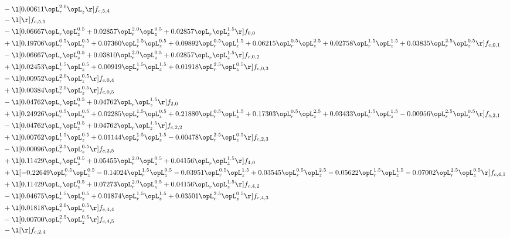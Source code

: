 \begin{alignat}{2}
& - \l[  0.00611 \opL_r^{2.0} \opL_z  \r] f_{c,5,4} \nonumber \\ 
& - \l[  \r] f_{c,5,5} \nonumber \\ 
& - \l[  0.06667 \opL_r \opL_z^{0.5} +  0.02857 \opL_r^{2.0} \opL_z^{0.5} +  0.02857 \opL_r \opL_z^{1.5}  \r] f_{0,0} \nonumber \\ 
& + \l[  0.19706 \opL_r^{0.5} \opL_z^{0.5} +  0.07360 \opL_r^{1.5} \opL_z^{0.5} +  0.09892 \opL_r^{0.5} \opL_z^{1.5} +  0.06215 \opL_r^{0.5} \opL_z^{2.5} +  0.02758 \opL_r^{1.5} \opL_z^{1.5} +  0.03835 \opL_r^{2.5} \opL_z^{0.5}  \r] f_{c,0,1} \nonumber \\ 
& - \l[  0.06667 \opL_r \opL_z^{0.5} +  0.03810 \opL_r^{2.0} \opL_z^{0.5} +  0.02857 \opL_r \opL_z^{1.5}  \r] f_{c,0,2} \nonumber \\ 
& + \l[  0.02453 \opL_r^{1.5} \opL_z^{0.5} +  0.00919 \opL_r^{1.5} \opL_z^{1.5} +  0.01918 \opL_r^{2.5} \opL_z^{0.5}  \r] f_{c,0,3} \nonumber \\ 
& - \l[  0.00952 \opL_r^{2.0} \opL_z^{0.5}  \r] f_{c,0,4} \nonumber \\ 
& + \l[  0.00384 \opL_r^{2.5} \opL_z^{0.5}  \r] f_{c,0,5} \nonumber \\ 
& - \l[  0.04762 \opL_r \opL_z^{0.5} +  0.04762 \opL_r \opL_z^{1.5}  \r] f_{2,0} \nonumber \\ 
& + \l[  0.24926 \opL_r^{0.5} \opL_z^{0.5} +  0.02285 \opL_r^{1.5} \opL_z^{0.5} +  0.21880 \opL_r^{0.5} \opL_z^{1.5} +  0.17303 \opL_r^{0.5} \opL_z^{2.5} +  0.03433 \opL_r^{1.5} \opL_z^{1.5}   -0.00956 \opL_r^{2.5} \opL_z^{0.5}  \r] f_{c,2,1} \nonumber \\ 
& - \l[  0.04762 \opL_r \opL_z^{0.5} +  0.04762 \opL_r \opL_z^{1.5}  \r] f_{c,2,2} \nonumber \\ 
& + \l[  0.00762 \opL_r^{1.5} \opL_z^{0.5} +  0.01144 \opL_r^{1.5} \opL_z^{1.5}   -0.00478 \opL_r^{2.5} \opL_z^{0.5}  \r] f_{c,2,3} \nonumber \\ 
& - \l[  0.00096 \opL_r^{2.5} \opL_z^{0.5}  \r] f_{c,2,5} \nonumber \\ 
& + \l[  0.11429 \opL_r \opL_z^{0.5} +  0.05455 \opL_r^{2.0} \opL_z^{0.5} +  0.04156 \opL_r \opL_z^{1.5}  \r] f_{4,0} \nonumber \\ 
& + \l[  -0.22649 \opL_r^{0.5} \opL_z^{0.5}   -0.14024 \opL_r^{1.5} \opL_z^{0.5}   -0.03951 \opL_r^{0.5} \opL_z^{1.5} +  0.03545 \opL_r^{0.5} \opL_z^{2.5}   -0.05622 \opL_r^{1.5} \opL_z^{1.5}   -0.07002 \opL_r^{2.5} \opL_z^{0.5}  \r] f_{c,4,1} \nonumber \\ 
& + \l[  0.11429 \opL_r \opL_z^{0.5} +  0.07273 \opL_r^{2.0} \opL_z^{0.5} +  0.04156 \opL_r \opL_z^{1.5}  \r] f_{c,4,2} \nonumber \\ 
& - \l[  0.04675 \opL_r^{1.5} \opL_z^{0.5} +  0.01874 \opL_r^{1.5} \opL_z^{1.5} +  0.03501 \opL_r^{2.5} \opL_z^{0.5}  \r] f_{c,4,3} \nonumber \\ 
& + \l[  0.01818 \opL_r^{2.0} \opL_z^{0.5}  \r] f_{c,4,4} \nonumber \\ 
& - \l[  0.00700 \opL_r^{2.5} \opL_z^{0.5}  \r] f_{c,4,5} \nonumber \\ 
& - \l[  \r] f_{c,2,4} \nonumber \\ 
\end{alignat} 


